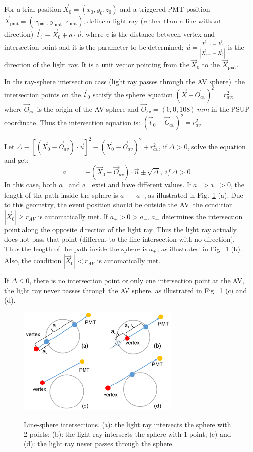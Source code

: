For a trial position $\vec{X}_0=(x_0,y_0,z_0)$ and a triggered PMT position $\vec{X}_{\mathrm{pmt}}=(x_\mathrm{pmt},y_\mathrm{pmt},z_\mathrm{pmt})$, define a light ray (rather than a line without direction) $\vec{l}_0\equiv\vec{X}_0+a\cdot \vec{u}$, where $a$ is the distance between vertex and intersection point and it is the parameter to be determined; $\vec u=\frac{\vec{X}_{\mathrm{pmt}}-\vec{X}_0}{|\vec{X}_{\mathrm{pmt}}-\vec{X}_0|}$ is the direction of the light ray. It is a unit vector pointing from the $\vec{X}_0$ to the $\vec{X}_{\mathrm{pmt}}$.

In the ray-sphere intersection case (light ray passes through the AV sphere), the intersection points on the $\vec{l}_0$ satisfy the sphere equation $(\vec{X}-\vec{O}_{av})^2= r^2_{av}$, where $\vec{O}_{av}$ is the origin of the AV sphere and $\vec{O}_{av} = (0,0,108)~mm$ in the PSUP coordinate. Thus the intersection equation is:
$(\vec{l}_0-\vec{O}_{av})^2 = r^2_{av}$.

Let $\Delta \equiv {[(\vec{X}_0-\vec{O}_{av})\cdot\vec{u}]}^2-{(\vec{X}_0-\vec{O}_{av})}^2+r^2_{av}$, if $\Delta>0$, solve the equation and get:
\begin{equation}\label{eq:ray-sphere}
a_{+,-} = -(\vec{X}_0-\vec{O}_{av})\cdot\vec{u}\pm\sqrt{\Delta},~if~\Delta>0.
\end{equation}
In this case, both $a_+$ and $a_-$ exist and have different values. If $a_+>a_->0$, the length of the path inside the sphere is $a_+-a_-$, as illustrated in Fig.~\ref{line-sphere} (a). Due to this geometry, the event position should be outside the AV, the condition $|\vec{X}_0|\geq r_{AV}$ is automatically met. If $a_+>0>a_-$, $a_-$ determines the intersection point along the opposite direction of the light ray. Thus the light ray actually does not pass that point (different to the line intersection with no direction). Thus the length of the path inside the sphere is $a_+$, as illustrated in Fig.~\ref{line-sphere} (b). Also, the condition $|\vec{X}_0|<r_{AV}$ is automatically met. 

If $\Delta\leq0$,
there is no intersection point or only one intersection point at the AV, the light ray never passes through the AV sphere, as illustrated in Fig.~\ref{line-sphere} (c) and (d).

\begin{figure}
	\centering
{\includegraphics[width=80mm]{line-sphere.png}}
\caption{Line-sphere intersections. (a): the light ray intersects the sphere with 2 points; (b): the light ray intersects the sphere with 1 point; (c) and (d): the light ray never passes through the sphere.}\label{line-sphere}
\end{figure}

